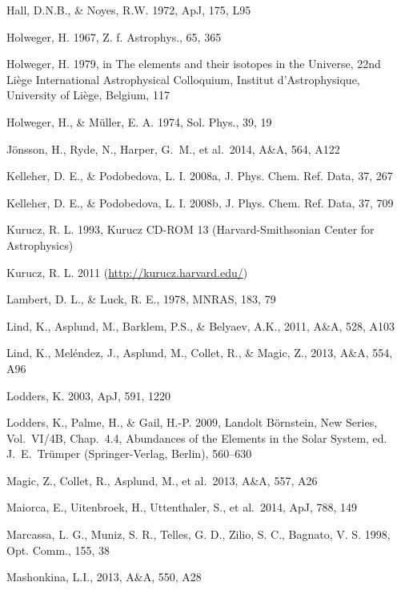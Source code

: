 \documentclass[traditabstract]{aa}
\begin{document}
\begin{thebibliography}{}
  Hall, D.N.B., \& Noyes, R.W. 1972, ApJ, 175, L95

  Holweger, H. 1967, Z. f. Astrophys., 65, 365

  Holweger, H. 1979, in The elements and their isotopes in the Universe, 22nd Li\`ege International Astrophysical Colloquium, Institut d'Astrophysique, University of Li\`ege, Belgium, 117

  Holweger, H., \& M\"{u}ller, E. A. 1974, Sol. Phys., 39, 19

  J{\"o}nsson, H., Ryde, N., {Harper}, G.~M., et al.\ 2014, A\&A, 564, A122

  Kelleher, D. E., \& Podobedova, L. I. 2008a, J. Phys. Chem. Ref. Data, 37, 267

  Kelleher, D. E., \& Podobedova, L. I. 2008b, J. Phys. Chem. Ref. Data, 37, 709

  Kurucz, R. L. 1993, Kurucz CD-ROM 13 (Harvard-Smithsonian Center for Astrophysics) 

  Kurucz, R. L. 2011 (\href{http://kurucz.harvard.edu/}{http://kurucz.harvard.edu/})

  Lambert, D. L., \& Luck, R. E., 1978, MNRAS, 183, 79
 
  Lind, K., Asplund, M., Barklem, P.S., \& Belyaev, A.K., 2011, A\&A, 528, A103

  Lind, K., Mel\'endez, J., Asplund, M., Collet, R., \& Magic, Z., 2013, A\&A, 554, A96

  Lodders, K. 2003, ApJ, 591, 1220

  Lodders, K., Palme, H., \& Gail, H.-P. 2009, Landolt B\"ornstein, New Series, Vol.\ VI/4B, Chap.\ 4.4, Abundances of the Elements in the Solar System, ed. J.~E.\ Tr\"umper (Springer-Verlag, Berlin), 560--630

  {Magic}, Z., {Collet}, R., {Asplund}, M., et al.\ 2013, A\&A, 557, A26

  {Maiorca}, E., {Uitenbroek}, H., {Uttenthaler}, S., et al.\ 2014, ApJ, 788, 149

  Marcassa, L. G., Muniz, S. R., Telles, G. D., Zilio, S. C., Bagnato, V. S. 1998, Opt. Comm., 155, 38

  Mashonkina, L.I., 2013, A\&A, 550, A28


\end{thebibliography}
\end{document}
